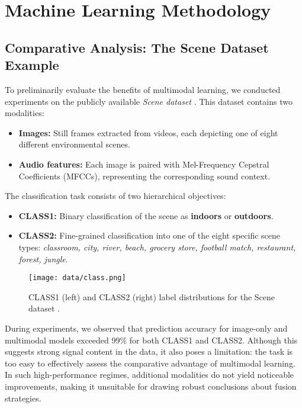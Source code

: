 \documentclass[english,bachelor,oneside]{ctufit-thesis}
\begin{document}
\chapter{Machine Learning Methodology}
\label{ch:ml_methods}

\section{Comparative Analysis: The Scene Dataset Example}

To preliminarily evaluate the benefits of multimodal learning, we conducted experiments on the publicly available \textit{Scene dataset} \cite{SceneCla95:online}. This dataset contains two modalities:
\begin{itemize}
    \item \textbf{Images:} Still frames extracted from videos, each depicting one of eight different environmental scenes.
    \item \textbf{Audio features:} Each image is paired with Mel-Frequency Cepstral Coefficients (MFCCs), representing the corresponding sound context.
\end{itemize}

The classification task consists of two hierarchical objectives:
\begin{itemize}
    \item \textbf{CLASS1:} Binary classification of the scene as \textbf{indoors} or \textbf{outdoors}.
    \item \textbf{CLASS2:} Fine-grained classification into one of the eight specific scene types: \textit{classroom, city, river, beach, grocery store, football match, restaurant, forest, jungle}.
\end{itemize}

\begin{figure}[H]
    \centering
    \texttt{[image: data/class.png]}
    \caption{CLASS1 (left) and CLASS2 (right) label distributions for the Scene dataset \cite{scene}.}
    \label{fig:scene_pie}
\end{figure}

During experiments, we observed that prediction accuracy for image-only and multimodal models exceeded 99\% for both CLASS1 and CLASS2. Although this suggests strong signal content in the data, it also poses a limitation: the task is too easy to effectively assess the comparative advantage of multimodal learning. In such high-performance regimes, additional modalities do not yield noticeable improvements, making it unsuitable for drawing robust conclusions about fusion strategies.
\end{document}
